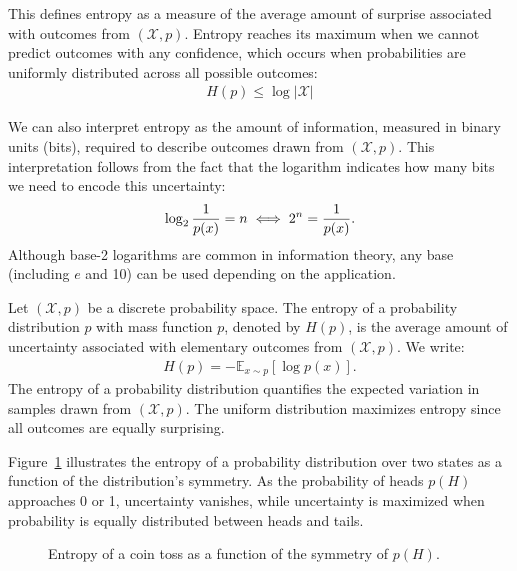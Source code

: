 This defines entropy as a measure of the average amount of surprise associated with outcomes from $(\mathcal{X}, p)$. Entropy reaches its maximum when we cannot predict outcomes with any confidence, which occurs when probabilities are uniformly distributed across all possible outcomes:
\begin{align}
	\label{eq:eta-2}
	H(p) \leq \log{|\mathcal{X}|}
\end{align}

We can also interpret entropy as the amount of information, measured in binary units (bits), required to describe outcomes drawn from $(\mathcal{X}, p)$. This interpretation follows from the fact that the logarithm indicates how many bits we need to encode this uncertainty:
\begin{align}
	\label{eq:understand-log}
	\log_2{1 \over p(x)} = n \iff 2^n = {1 \over p(x)}.
\end{align}
Although base-2 logarithms are common in information theory, any base (including $e$ and 10) can be used depending on the application.

\begin{definition}
	Let $(\mathcal{X}, p)$ be a discrete probability space. The \textnormal{\sffamily
		entropy} of a probability distribution $p$ with mass function $p$, denoted
	by $H(p)$, is the average amount of uncertainty associated with elementary outcomes
	from $(\mathcal{X}, p)$. We write:
	\begin{align}
		\label{eq:entropy}
		H(p) = - \mathbb{E}_{x \sim p} \left[ \log{p(x)} \right].
	\end{align}
	The entropy of a probability distribution quantifies the expected variation in samples drawn from $(\mathcal{X}, p)$. The uniform distribution maximizes entropy since all outcomes are equally surprising.
\end{definition}

Figure~\ref{fig:entropy-coin-toss} illustrates the entropy of a probability distribution over two states as a function of the distribution's symmetry. As the probability of heads $p(H)$ approaches 0 or 1, uncertainty vanishes, while uncertainty is maximized when probability is equally distributed between heads and tails.

\begin{figure}[H]
	\centering
	\caption{Entropy of a coin toss as a function of the symmetry of $p(H)$.}%
	\label{fig:entropy-coin-toss}
\end{figure}

